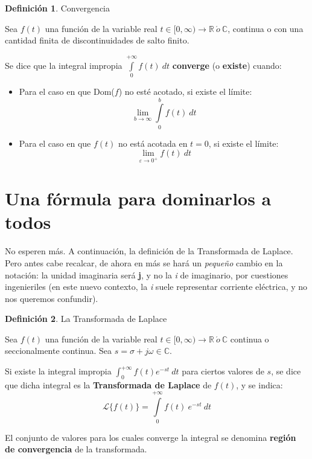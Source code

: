 \documentclass[12pt]{article}
\theoremstyle{definition}
\newtheorem{definition}{Definici\'on}[section]
\theoremstyle{theorem}
\theoremstyle{corolary}
\theoremstyle{method}
\begin{document}
\colorbox{violet!40!white!80}{\parbox{\linewidth}{
\theoremstyle{definition}
\begin{definition}{Convergencia}

Sea $f(t)$ una funci\'on de la variable real $t\in [0, \infty)\to \mathbb{R}\ \acute{o}\ \mathbb{C}$, continua o con una cantidad finita de discontinuidades de salto finito.

Se dice que la integral impropia $\int\limits_0^{+\infty} f(t)\ dt$ \textbf{converge} (o \textbf{existe}) cuando:
\begin{itemize}
	\item Para el caso en que Dom($f$) no est\'e acotado, si existe el l\'imite: $$\lim\limits_{b\to\infty} \int\limits_0^b f(t)\ dt$$
	\item Para el caso en que $f(t)$ no est\'a acotada en $t=0$, si existe el l\'imite: $$\lim\limits_{\varepsilon\to 0^+}f(t)\ dt$$
\end{itemize}

\end{definition}}}
\linebreak
\linebreak

\section{Una f\'ormula para dominarlos a todos}

No esperen m\'as. A continuaci\'on, la definici\'on de la Transformada de Laplace. Pero antes cabe recalcar, de ahora en m\'as se har\'a un \textit{peque\~no} cambio en la notaci\'on: la unidad imaginaria ser\'a \textbf{j}, y no la \textit{i} de imaginario, por cuestiones ingenieriles (en este nuevo contexto, la \textit{i} suele representar corriente el\'ectrica, y no nos queremos confundir).\\

\colorbox{red!40!white!80}{\parbox{\linewidth}{
\theoremstyle{definition}
\begin{definition}{La Transformada de Laplace}

Sea $f(t)$ una funci\'on de la variable real $t\in[0,\infty)\to \mathbb{R}\ \acute{o} \ \mathbb{C}$ continua o seccionalmente continua.
Sea $s = \sigma + j\omega \in \mathbb{C}$.

Si existe la integral impropia $\int_0^{+\infty}f(t) e^{-st}\ dt$ para ciertos valores de $s$, se dice que dicha integral es la \textbf{Transformada de Laplace} de $f(t)$, y se indica: $$\mathscr{L}\{f(t)\} = \int\limits_0^{+\infty}f(t)\ e^{-st}\ dt$$

El conjunto de valores para los cuales converge la integral se denomina \textbf{regi\'on de convergencia} de la transformada.
\end{definition}}}
\linebreak
\linebreak
\end{document}
